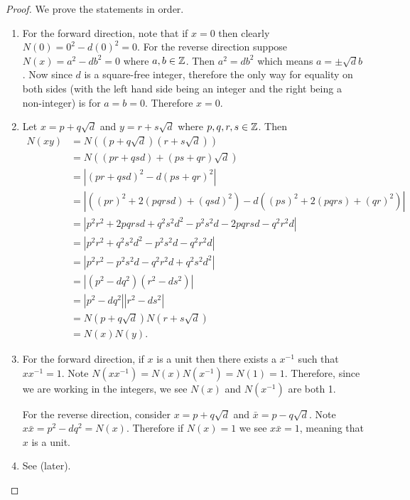 \begin{proof}
    We prove the statements in order.
    \begin{enumerate}
        \item For the forward direction, note that if $x = 0$ then clearly $N(0) = 0^2 - d(0)^2 = 0$. For the reverse direction suppose $N(x) = a^2 - db^2 = 0$ where $a,b \in \mathbb{Z}$. Then $a^2 = db^2$ which means $a = \pm\sqrt{d}b$. Now since $d$ is a square-free integer, therefore the only way for equality on both sides (with the left hand side being an integer and the right being a non-integer) is for $a = b = 0$. Therefore $x = 0$.

        \item Let $x = p + q\sqrt{d}$ and $y = r + s\sqrt{d}$ where $p,q,r,s \in \mathbb{Z}$. Then
        \begin{align*}
            N(xy) &= N((p+q\sqrt{d})(r+s\sqrt{d}))\\
            &= N((pr + qsd) + (ps + qr)\sqrt{d})\\
            &= |(pr+qsd)^2 - d(ps+qr)^2|\\
            &= |((pr)^2 + 2(pqrsd) + (qsd)^2) - d((ps)^2 + 2(pqrs) + (qr)^2)|\\
            &= |p^2r^2 + 2pqrsd + q^2s^2d^2 - p^2s^2d - 2pqrsd - q^2r^2d|\\
            &= |p^2r^2 + q^2s^2d^2 - p^2s^2d - q^2r^2d|\\
            &= |p^2r^2 - p^2s^2d - q^2r^2d + q^2s^2d^2|\\
            &= |(p^2 - dq^2)(r^2 - ds^2)|\\
            &= |p^2 - dq^2||r^2 - ds^2|\\
            &= N(p+q\sqrt{d})N(r+s\sqrt{d})\\
            &= N(x)N(y).
        \end{align*}

        \item For the forward direction, if $x$ is a unit then there exists a $x^{-1}$ such that $xx^{-1} = 1$. Note $N(xx^{-1}) = N(x)N(x^{-1}) = N(1) = 1$. Therefore, since we are working in the integers, we see $N(x)$ and $N(x^{-1})$ are both 1.

        For the reverse direction, consider $x = p+q\sqrt{d}$ and $\bar{x} = p-q\sqrt{d}$. Note $x\bar{x} = p^2-dq^2 = N(x)$. Therefore if $N(x) = 1$ we see $x\bar{x} = 1$, meaning that $x$ is a unit.

        \item See  (later). \qedhere
    \end{enumerate}
\end{proof}

